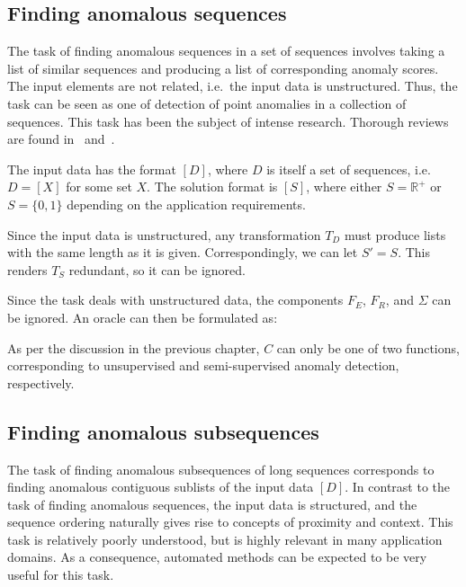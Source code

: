 \subsection{Finding anomalous sequences}

The task of finding anomalous sequences in a set of sequences involves taking a list of similar sequences and producing a list of corresponding anomaly scores. The input elements are not related, i.e.\ the input data is unstructured. Thus, the task can be seen as one of detection of point anomalies in a collection of sequences. This task has been the subject of intense research. Thorough reviews are found in~\cite{chandola2} and~\cite{chandola3}.

The input data has the format $[D]$, where $D$ is itself a set of sequences, i.e.\ $D = [X]$ for some set $X$. The solution format is $[S]$, where either $S = \mathbb{R}^+$ or $S = \{0, 1\}$ depending on the application requirements.

Since the input data is unstructured, any transformation $T_D$ must produce lists with the same length as it is given. Correspondingly, we can let $S' = S$. This renders $T_S$ redundant, so it can be ignored.

Since the task deals with unstructured data, the components $F_E$, $F_R$, and $\Sigma$ can be ignored. An oracle can then be formulated as:

\begin{algorithmic}
     
    \EndFor{}
\end{algorithmic}

As per the discussion in the previous chapter, $C$ can only be one of two functions, corresponding to unsupervised and semi-supervised anomaly detection, respectively.

\subsection{Finding anomalous subsequences}

The task of finding anomalous subsequences of long sequences corresponds to finding anomalous contiguous sublists of the input data $[D]$. In contrast to the task of finding anomalous sequences, the input data is structured, and the sequence ordering naturally gives rise to concepts of proximity and context. This task is relatively poorly understood, but is highly relevant in many application domains. As a consequence, automated methods can be expected to be very useful for this task.


